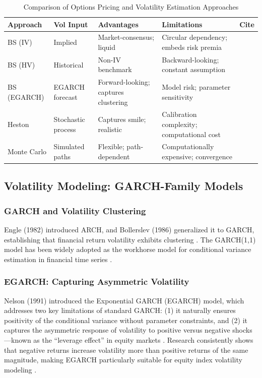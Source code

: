 \documentclass[journal]{IEEEtran}
\begin{document}
\begin{table}[!ht]
\centering
\caption{Comparison of Options Pricing and Volatility Estimation
Approaches}
\label{tab:pricing_approaches}
\small
\begin{tabularx}{\textwidth}{l l X X l}
\toprule
\textbf{Approach} & \textbf{Vol Input} & \textbf{Advantages} &
\textbf{Limitations} & \textbf{Cite} \\
\midrule
BS (IV)      & Implied          & Market-consensus; liquid &
  Circular dependency; embeds risk premia & \cite{black1973} \\
BS (HV)      & Historical       & Non-IV benchmark &
  Backward-looking; constant assumption   & \cite{hull2022} \\
BS (EGARCH)  & EGARCH forecast  & Forward-looking; captures clustering &
  Model risk; parameter sensitivity       & \cite{nelson1991,bollerslev1986} \\
Heston       & Stochastic process & Captures smile; realistic &
  Calibration complexity; computational cost & \cite{heston1993} \\
Monte Carlo  & Simulated paths  & Flexible; path-dependent &
  Computationally expensive; convergence  & \cite{glasserman2004} \\
\bottomrule
\end{tabularx}
\end{table}

\subsection{Volatility Modeling: GARCH-Family Models}

\subsubsection{GARCH and Volatility Clustering}
Engle (1982) introduced ARCH, and Bollerslev (1986) generalized it to
GARCH, establishing that financial return volatility exhibits
clustering \cite{engle1982,bollerslev1986}. The GARCH(1,1) model has
been widely adopted as the workhorse model for conditional variance
estimation in financial time series \cite{tsay2010}.

\subsubsection{EGARCH: Capturing Asymmetric Volatility}
Nelson (1991) introduced the Exponential GARCH (EGARCH) model, which
addresses two key limitations of standard GARCH: (1) it naturally
ensures positivity of the conditional variance without parameter
constraints, and (2) it captures the asymmetric response of volatility
to positive versus negative shocks---known as the ``leverage effect''
in equity markets \cite{nelson1991}. Research consistently shows that
negative returns increase volatility more than positive returns of the
same magnitude, making EGARCH particularly suitable for equity index
volatility modeling \cite{tsay2010,das2022}.
\end{document}
